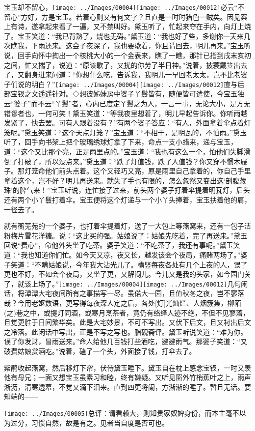 宝玉却不留心，{\texttt{[image: ../Images/00004]}\texttt{[image: ../Images/00012]}\footnotesize \kaishu 必云``不留心''方好，方是宝玉。若着心则又有何文字？且直是一时时猎色一贼矣。}因见案上有诗，遂拿起来看了一遍，又不禁叫好。黛玉听了，忙起来夺在手内，向灯上烧了。宝玉笑道：``我已背熟了，烧也无碍。''黛玉道：``我也好了些，多谢你一天来几次瞧我，下雨还来。这会子夜深了，我也要歇着，你且请回去，明儿再来。''宝玉听说，回手向怀中掏出一个核桃大小的一个金表来，瞧了一瞧，那针已指到戌末亥初之间，忙又揣了，说道：``原该歇了，又扰的你劳了半日神。''说着，披蓑戴笠出去了，又翻身进来问道：``你想什么吃，告诉我，我明儿一早回老太太，岂不比老婆子们说的明白？''{\texttt{[image: ../Images/00004]}\texttt{[image: ../Images/00012]}\footnotesize \kaishu 直与后部宝钗之文遥遥针对。◇想彼姊妹房中婆子丫鬟皆有，随便皆可遣使，今宝玉独云``婆子''而不云``丫鬟''者，心内已度定丫鬟之为人，一言一事，无论大小，是方无错谬者也，一何可笑！}黛玉笑道：``等我夜里想着了，明儿早起告诉你。你听雨越发紧了，快去罢。可有人跟着没有？''有两个婆子答应：``有人，外面拿着伞点着灯笼呢。''黛玉笑道：``这个天点灯笼？''宝玉道：``不相干，是明瓦的，不怕雨。''黛玉听了，回手向书架上把个玻璃绣球灯拿了下来，命点一支小蜡来，递与宝玉，道：``这个又比那个亮，正是雨里点的。''宝玉道：``我也有这么一个，怕他们失脚滑倒了打破了，所以没点来。''黛玉道：``跌了灯值钱，跌了人值钱？你又穿不惯木屐子。那灯笼命他们前头点着。这个又轻巧又亮，原是雨里自己拿着的，你自己手里拿着这个，岂不好？明儿再送来。就失了手也有限的，怎么忽然又变出这`剖腹藏珠'的脾气来！''宝玉听说，连忙接了过来，前头两个婆子打着伞提着明瓦灯，后头还有两个小丫鬟打着伞。宝玉便将这个灯递与一个小丫头捧着，宝玉扶着他的肩，一径去了。

就有蘅芜苑的一个婆子，也打着伞提着灯，送了一大包上等燕窝来，还有一包子洁粉梅片雪花洋糖。说：``这比买的强。姑娘说了：姑娘先吃着，完了再送来。''黛玉回说``费心''，命他外头坐了吃茶。婆子笑道：``不吃茶了，我还有事呢。''黛玉笑道：``我也知道你们忙。如今天又凉，夜又长，越发该会个夜局，痛赌两场了。''婆子笑道：``不瞒姑娘说，今年我大沾光儿了。横竖每夜各处有几个上夜的人，误了更也不好，不如会个夜局，又坐了更，又解闷儿。今儿又是我的头家，如今园门关了，就该上场了。''{\texttt{[image: ../Images/00004]}\texttt{[image: ../Images/00012]}\footnotesize \kaishu 几句闲话，将潭潭大宅夜间所有之事描写一尽。虽偌大一园，且值秋冬之夜，岂不寥落哉？今用老妪数语，更写得每夜深人定之后，各处{[}灯{]}光灿烂、人烟簇集，柳陌{(之)}巷之中，或提灯同酒，或寒月烹茶者，竟仍有络绎人迹不绝，不但不见寥落，且觉更胜于日间繁华矣。此是大宅妙景，不可不写出。又伏下后文，且又衬出后文之冷落。此闲话中写出，正是不写之写也。脂砚斋评。}黛玉听说笑道：``难为你。误了你发财，冒雨送来。''命人给他几百钱打些酒吃，避避雨气。那婆子笑道：``又破费姑娘赏酒吃。''说着，磕了一个头，外面接了钱，打伞去了。

紫鹃收起燕窝，然后移灯下帘，伏侍黛玉睡下。黛玉自在枕上感念宝钗，一时又羡他有母兄；一面又想宝玉虽素习和睦，终有嫌疑。又听见窗外竹梢蕉叶之上，雨声淅沥，清寒透幕，不觉又滴下泪来。直到四更将阑，方渐渐的睡了。暂且无话。要知端的------

{\texttt{[image: ../Images/00005]}总评：请看赖大，则知贵家奴婢身份，而本主毫不以为过分，习惯自然，故是有之。见者当自度是否可也。}
